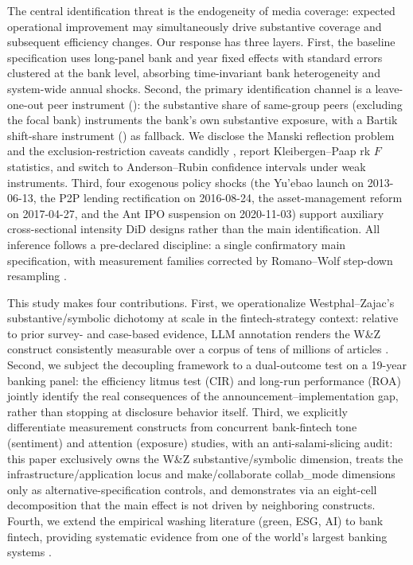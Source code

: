 The central identification threat is the endogeneity of media coverage:
expected operational improvement may simultaneously drive substantive coverage
and subsequent efficiency changes. Our response has three layers. First, the
baseline specification uses long-panel bank and year fixed effects with
standard errors clustered at the bank level, absorbing time-invariant bank
heterogeneity and system-wide annual shocks. Second, the primary
identification channel is a leave-one-out peer instrument
(): the substantive share of same-group
peers (excluding the focal bank) instruments the bank's own substantive
exposure, with a Bartik shift-share instrument
() as fallback. We disclose the Manski
reflection problem and the exclusion-restriction caveats candidly
\parencite{manski1993reflection,learyroberts2014peer}, report
Kleibergen--Paap rk $F$ statistics, and switch to Anderson--Rubin confidence
intervals under weak instruments. Third, four exogenous policy shocks (the
Yu'ebao launch on 2013-06-13, the P2P lending rectification on 2016-08-24, the
asset-management reform on 2017-04-27, and the Ant IPO suspension on
2020-11-03) support auxiliary cross-sectional intensity DiD designs rather
than the main identification. All inference follows a pre-declared
discipline: a single confirmatory main specification, with measurement
families corrected by Romano--Wolf step-down resampling
\parencite{romanowolf2005stepwise}.

This study makes four contributions. First, we operationalize
Westphal--Zajac's substantive/symbolic dichotomy at scale in the
fintech-strategy context: relative to prior survey- and case-based evidence,
LLM annotation renders the W\&Z construct consistently measurable over a
corpus of tens of millions of articles
\parencite{gilardi2023chatgpt,carlsonburbano2026llm}. Second, we subject the
decoupling framework to a dual-outcome test on a 19-year banking panel: the
efficiency litmus test (CIR) and long-run performance (ROA) jointly identify
the real consequences of the announcement--implementation gap, rather than
stopping at disclosure behavior itself. Third, we explicitly differentiate
measurement constructs from concurrent bank-fintech tone (sentiment) and
attention (exposure) studies, with an anti-salami-slicing audit: this paper
exclusively owns the W\&Z substantive/symbolic dimension, treats the
infrastructure/application locus and make/collaborate collab\_mode dimensions
only as alternative-specification controls, and demonstrates via an
eight-cell decomposition that the main effect is not driven by neighboring
constructs. Fourth, we extend the empirical washing literature (green, ESG,
AI) to bank fintech, providing systematic evidence from one of the world's
largest banking systems \parencite{giannetti2026glossy,song2026aiwashing}.

